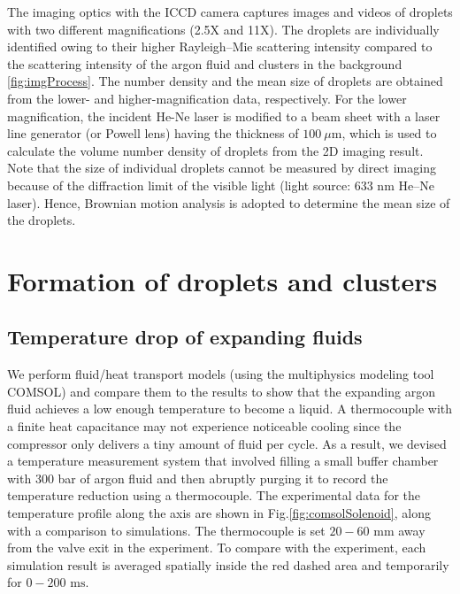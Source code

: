The imaging optics with the ICCD camera captures images and videos of droplets with two different magnifications (2.5X and 11X). The droplets are individually identified owing to their higher Rayleigh–Mie scattering intensity compared to the scattering intensity of the argon fluid and clusters in the background \ref{fig:imgProcess}. The number density and the mean size of droplets are obtained from the lower- and higher-magnification data, respectively. For the lower magnification, the incident He-Ne laser is modified to a beam sheet with a laser line generator (or Powell lens) having the thickness of $100 ~\mu\text{m}$, which is used to calculate the volume number density of droplets from the 2D imaging result. Note that the size of individual droplets cannot be measured by direct imaging because of the diffraction limit of the visible light (light source: 633 nm He–Ne laser). Hence, Brownian motion analysis is adopted to determine the mean size of the droplets.



\section{Formation of droplets and clusters}
\label{sec:ch2-3}

\subsection{Temperature drop of expanding fluids}
\label{sec:ch2-3-1}

We perform fluid/heat transport models (using the multiphysics modeling tool COMSOL) and compare them to the results to show that the expanding argon fluid achieves a low enough temperature to become a liquid. A thermocouple with a finite heat capacitance may not experience noticeable cooling since the compressor only delivers a tiny amount of fluid per cycle. As a result, we devised a temperature measurement system that involved filling a small buffer chamber with 300 bar of argon fluid and then abruptly purging it to record the temperature reduction using a thermocouple. The experimental data for the temperature profile along the axis are shown in Fig.\ref{fig:comsolSolenoid}, along with a comparison to simulations. The thermocouple is set $20-60 \text{ mm}$ away from the valve exit in the experiment. To compare with the experiment, each simulation result is averaged spatially inside the red dashed area and temporarily for $0-200 \text{ ms}$.

